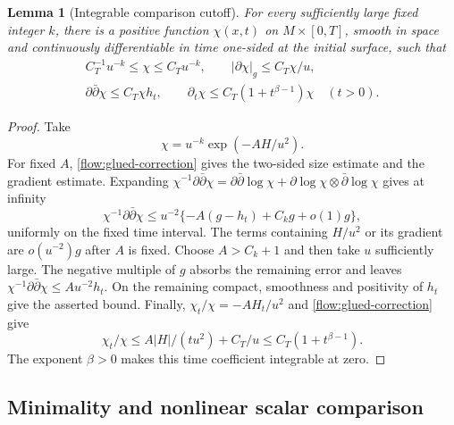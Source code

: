 \documentclass[11pt]{article}
\newtheorem{lemma}[theorem]{Lemma}
\theoremstyle{definition}
\theoremstyle{remark}
\newcommand{\dd}{\partial\bar\partial}
\numberwithin{equation}{section}
\begin{document}
\begin{lemma}[Integrable comparison cutoff]\label{flow:cutoff-lemma}
For every sufficiently large fixed integer $k$, there is a positive
function $\chi(x,t)$ on $M\times[0,T]$, smooth in space and continuously
differentiable in time one-sided at the initial surface, such that
\begin{equation}\label{flow:cutoff-bounds}
 \begin{gathered}
 C_T^{-1}u^{-k}\le\chi\le C_Tu^{-k},\qquad
 |\partial\chi|_g\le C_T\chi/u,\\
 \dd\chi\le C_T\chi h_t,
 \qquad \partial_t\chi\le C_T(1+t^{\beta-1})\chi
 \quad(t>0).
 \end{gathered}
\end{equation}
\end{lemma}

\begin{proof}
Take
\[
 \chi=u^{-k}\exp(-AH/u^2).
\]
For fixed $A$, \eqref{flow:glued-correction} gives the two-sided
size estimate and the gradient estimate.  Expanding
$\chi^{-1}\dd\chi=\dd\log\chi+
\partial\log\chi\otimes\bar\partial\log\chi$ gives at infinity
\[
 \chi^{-1}\dd\chi
 \le u^{-2}\{-A(g-h_t)+C_kg+o(1)g\},
\]
uniformly on the fixed time interval.  The terms containing
$H/u^2$ or its gradient are $o(u^{-2})g$ after $A$ is fixed.
Choose $A>C_k+1$ and then take $u$ sufficiently large.  The negative
multiple of $g$ absorbs the remaining error and leaves
$\chi^{-1}\dd\chi\le Au^{-2}h_t$.  On the remaining compact,
smoothness and positivity of $h_t$ give the asserted bound.  Finally,
$\chi_t/\chi=-AH_t/u^2$ and \eqref{flow:glued-correction} give
\[
 \chi_t/\chi\le A|H|/(tu^2)+C_T/u
                  \le C_T(1+t^{\beta-1}).
\]
The exponent $\beta>0$ makes this time coefficient integrable at zero.
\end{proof}

\subsection{Minimality and nonlinear scalar comparison}
\end{document}
